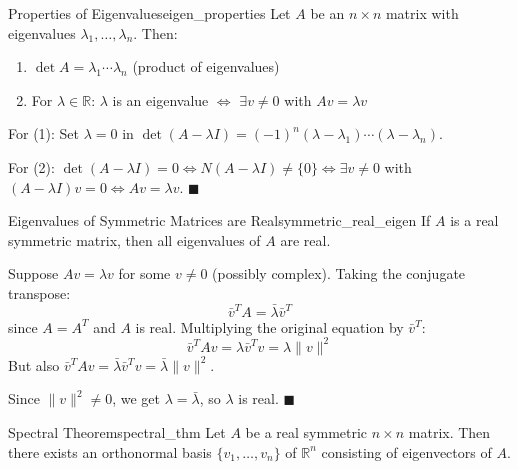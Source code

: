 \documentclass[11pt, letterpaper, openany]{book}
\renewenvironment{proof}[1][\proofname]{%
  \tcolorbox[blanker, breakable, left=1em,
    before skip=1em, after skip=1em,
    borderline west={2pt}{0pt}{MagicTeal!50},
    colback=MagicCream,
    before upper={\textcolor{MagicTeal}{\sffamily\bfseries #1.}\space}
  ]%
}{%
  \hfill\textcolor{MagicTeal}{\ensuremath{\blacksquare}}\endtcolorbox%
}
\begin{document}
\begin{lem}{Properties of Eigenvalues}{eigen_properties}
Let $A$ be an $n \times n$ matrix with eigenvalues $\lambda_1, \ldots, \lambda_n$. Then:
\begin{enumerate}
    \item $\det A = \lambda_1 \cdots \lambda_n$ (product of eigenvalues)
    \item For $\lambda \in \mathbb{R}$: $\lambda$ is an eigenvalue $\iff$ $\exists v \neq 0$ with $Av = \lambda v$
\end{enumerate}
\end{lem}

\begin{proof}
For (1): Set $\lambda = 0$ in $\det(A - \lambda I) = (-1)^n(\lambda - \lambda_1) \cdots (\lambda - \lambda_n)$.

For (2): $\det(A - \lambda I) = 0 \iff N(A - \lambda I) \neq \{0\} \iff \exists v \neq 0$ with $(A - \lambda I)v = 0 \iff Av = \lambda v$.
\end{proof}

\begin{lem}{Eigenvalues of Symmetric Matrices are Real}{symmetric_real_eigen}
If $A$ is a real symmetric matrix, then all eigenvalues of $A$ are real.
\end{lem}

\begin{proof}
Suppose $Av = \lambda v$ for some $v \neq 0$ (possibly complex). Taking the conjugate transpose:
\[\bar{v}^T A = \bar{\lambda} \bar{v}^T\]
since $A = A^T$ and $A$ is real. Multiplying the original equation by $\bar{v}^T$:
\[\bar{v}^T A v = \lambda \bar{v}^T v = \lambda \|v\|^2\]
But also $\bar{v}^T A v = \bar{\lambda} \bar{v}^T v = \bar{\lambda} \|v\|^2$.

Since $\|v\|^2 \neq 0$, we get $\lambda = \bar{\lambda}$, so $\lambda$ is real.
\end{proof}

\begin{thm}{Spectral Theorem}{spectral_thm}
Let $A$ be a real symmetric $n \times n$ matrix. Then there exists an orthonormal basis $\{v_1, \ldots, v_n\}$ of $\mathbb{R}^n$ consisting of eigenvectors of $A$.
\end{thm}
\end{document}
